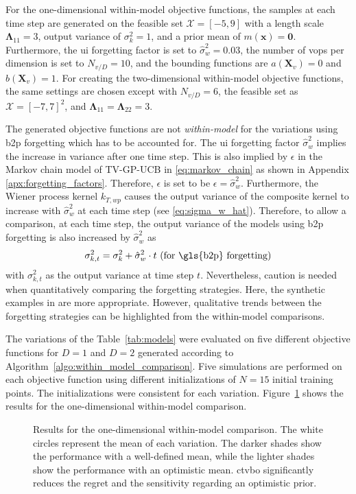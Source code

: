 For the one-dimensional within-model objective functions, the samples at each time step are generated on the feasible set $\mathcal{X} = [-5, 9]$ with a length scale $\boldsymbol\Lambda_{11} = 3$, output variance of $\sigma_k^2 = 1$, and a prior mean of $m(\mathbf{x}) = \mathbf{0}$. Furthermore, the \gls{ui} forgetting factor is set to $\hat{\sigma}_w^2=0.03$, the number of \glspl{vop} per dimension is set to $N_{v/D}=10$, and the bounding functions are $a(\mathbf{X}_v)=0$ and $b(\mathbf{X}_v)=1$. For creating the two-dimensional within-model objective functions, the same settings are chosen except with $N_{v/D}=6$, the feasible set as $\mathcal{X}=[-7,7]^2$, and $\boldsymbol\Lambda_{11} =\boldsymbol\Lambda_{22} = 3$.

The generated objective functions are not \emph{within-model} for the variations using \gls{b2p} forgetting which has to be accounted for. The \gls{ui} forgetting factor $\hat{\sigma}_w^2$ implies the increase in variance after one time step. This is also implied by $\epsilon$ in the Markov chain model of TV-GP-UCB in \eqref{eq:markov_chain} as shown in Appendix \ref{apx:forgetting_factors}. Therefore, $\epsilon$ is set to be $\epsilon=\hat{\sigma}_w^2$.
Furthermore, the Wiener process kernel $k_{T,wp}$ causes the output variance of the composite kernel to increase with $\hat{\sigma}_w^2$ at each time step (see \eqref{eq:sigma_w_hat}). Therefore, to allow a comparison, at each time step, the output variance of the models using \gls{b2p} forgetting is also increased by $\hat{\sigma}_w^2$ as
\begin{equation}
    \sigma_{k,t}^2 = \sigma_{k}^2 + \hat{\sigma}_w^2 \cdot t \text{ (for \gls{b2p} forgetting)}
\end{equation}
with $\sigma_{k,t}^2$ as the output variance at time step $t$.
Nevertheless, caution is needed when quantitatively comparing the forgetting strategies. Here, the synthetic examples in  are more appropriate. However, qualitative trends between the forgetting strategies can be highlighted from the within-model comparisons.

The variations of the Table~\ref{tab:models} were evaluated on five different objective functions for $D=1$ and $D=2$ generated according to Algorithm~\ref{algo:within_model_comparison}. Five simulations are performed on each objective function using different initializations of $N=15$ initial training points. The initializations were consistent for each variation. Figure~\ref{fig:WMC_cumulative_regret_1D} shows the results for the one-dimensional within-model comparison.
\begin{figure}[h]
    \centering
    
    \caption[Results of the one-dimensional within model comparison.]{Results for the one-dimensional within-model comparison. The white circles represent the mean of each variation. The darker shades show the performance with a well-defined mean, while the lighter shades show the performance with an optimistic mean. \gls{ctvbo} significantly reduces the regret and the sensitivity regarding an optimistic prior.}
    \label{fig:WMC_cumulative_regret_1D}
\end{figure}

